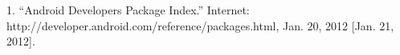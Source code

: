 %
%

1. “Android Developers Package Index.” Internet: http://developer.android.com/reference/packages.html, Jan. 20, 2012 [Jan. 21, 2012].